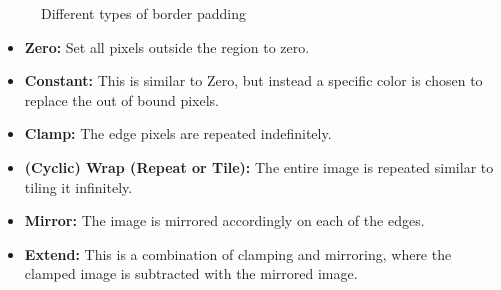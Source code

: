 \documentclass[twoside,a4paper,article]{combine}
\begin{document}
\begin{minipage}{\textwidth}\begin{figure}[H]
    \captionsetup{justification=centering}
    \centering
    \caption{Different types of border padding}
    \label{fig:padding_borders}
\end{figure}\end{minipage}
\begin{itemize}
    \item \textbf{Zero:} Set all pixels outside the region to zero.
    \item \textbf{Constant:} This is similar to Zero, but instead a specific color is chosen to replace the out of bound pixels.
    \item \textbf{Clamp:} The edge pixels are repeated indefinitely.
    \item \textbf{(Cyclic) Wrap (Repeat or Tile):} The entire image is repeated similar to tiling it infinitely.
    \item \textbf{Mirror:} The image is mirrored accordingly on each of the edges.
    \item \textbf{Extend:} This is a combination of clamping and mirroring, where the clamped image is subtracted with the mirrored image.
\end{itemize}\label{chap:padding}
\end{document}
